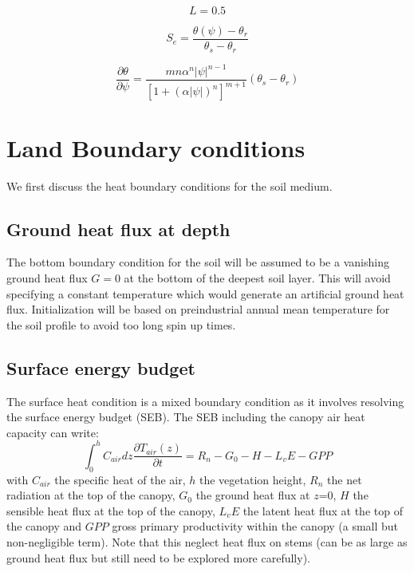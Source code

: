 \documentclass{article}
\begin{document}
\begin{equation}
L = 0.5
\end{equation}

\begin{equation}
     S_e = \frac{\theta(\psi) - \theta_r}{\theta_s - \theta_r}
\end{equation}

\begin{equation}
     \frac{\partial \theta}{\partial \psi} =   \frac{m n\alpha^n |\psi|^{n-1}}{\left[ 1+(\alpha |\psi|)^n \right]^{m+1}} \left( \theta_s - \theta_r \right) 
\end{equation}






\section{Land Boundary conditions}
We first discuss the heat boundary conditions for the soil medium.
\subsection{Ground heat flux at depth}
The bottom boundary condition for the soil will be assumed to be a vanishing ground heat flux $G=0$ at the bottom of the deepest soil layer. This will avoid specifying a constant temperature which would generate an artificial ground heat flux. Initialization will be based on preindustrial annual mean temperature for the soil profile to avoid too long spin up times.

\subsection{Surface energy budget}
The surface heat condition is a mixed boundary condition as it involves resolving the surface energy budget (SEB). The SEB including the canopy air heat capacity can write:
\begin{equation}
    \int_0^h{C_{air}dz \frac{\partial T_{air}(z)}{\partial t}} = R_n - G_0 - H - L_vE - GPP 
\end{equation}
with $C_{air}$ the specific heat of the air, $h$ the vegetation height, $R_n$ the net radiation at the top of the canopy, $G_0$ the ground heat flux at $z$=0, $H$ the sensible heat flux at the top of the canopy, $L_vE$ the latent heat flux at the top of the canopy and $GPP$ gross primary productivity within the canopy (a small but non-negligible term). Note that this neglect heat flux on stems (can be as large as ground heat flux but still need to be explored more carefully).
\end{document}
